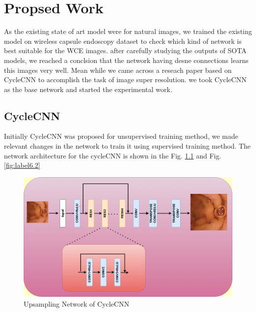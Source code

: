 \chapter{Propsed Work}
As the existing state of art model were for natural images, we trained the existing model on wireless capsule endoscopy dataset to check which kind of network is best suitable for the WCE images. after carefully studying the outputs of SOTA models, we reached a conclsion that the network having desne connections learns this images very well. Mean while we came across a reseach paper based on CycleCNN {\cite{CycleCNN}} to accomplish the task of image super resolution. we took CycleCNN as the base network and started the experimental work.
\section{CycleCNN}
Initially CycleCNN was proposed for unsupervised training method, we made relevant changes in the network to train it using supervised training method. The network architecture for the cycleCNN is shown in the Fig. \ref{fig:label6.1} and Fig. \ref{fig:label6.2}



\begin{figure}[H]
    \centering
    \includegraphics[totalheight=3.5in]{Chapter6/CycleCNN_UP.png}
    \caption[Upsampling Network of CycleCNN]{Upsampling Network of CycleCNN}
    \label{fig:label6.1}
\end{figure}

